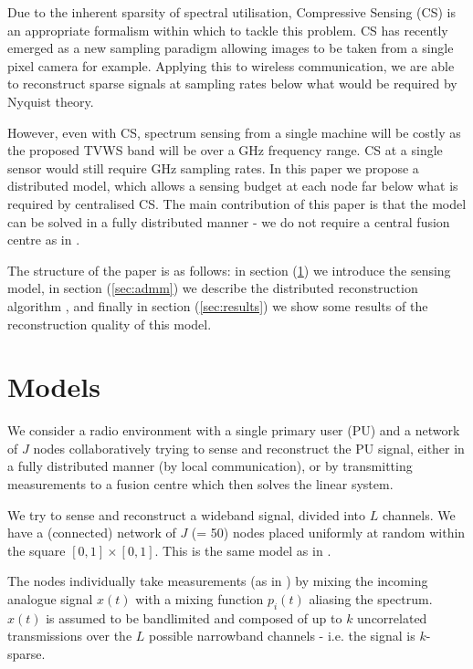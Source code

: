 \documentclass[conference]{IEEEtran}
\begin{document}
Due to the inherent sparsity of spectral utilisation, Compressive Sensing (CS) \cite{Candes2006} is an appropriate formalism within which to tackle this problem. CS has recently emerged as a new sampling paradigm allowing images to be taken from a single pixel camera for example. Applying this to wireless communication, we are able to reconstruct sparse signals at sampling rates below what would be required by Nyquist theory. 

However, even with CS, spectrum sensing from a single machine will be costly as the proposed TVWS band will be over a GHz frequency range. CS at a single sensor would still require GHz sampling rates. In this paper we propose a distributed model, which allows a sensing budget at each node far below what is required by centralised CS. The main contribution of this paper is that the model can be solved in a fully distributed manner - we do not require a central fusion centre as in \cite{Zhang2011b}.

The structure of the paper is as follows: in section (\ref{sec:sensingmodel}) we introduce the sensing model, in section (\ref{sec:admm}) we describe the distributed reconstruction algorithm \cite{mota2013d}, and finally in section (\ref{sec:results}) we show some results of the reconstruction quality of this model. \cite{mishali2010theory} \cite{tropp2010beyond}

\section{Models}\label{sec:sensingmodel}

We consider a radio environment with a single primary user (PU) and a network of \(J\) nodes collaboratively trying to sense and reconstruct the PU signal, either in a fully distributed manner (by local communication), or by transmitting measurements to a fusion centre which then solves the linear system. 

We try to sense and reconstruct a wideband signal, divided into \(L\) channels. We have a (connected) network of \(J\) (= 50) nodes placed uniformly at random within the square \(  \left[0,1\right]\times \left[0,1\right] \). This is the same model as in \cite{Zhang2011b}.

The nodes individually take measurements (as in \cite{mishali2010theory}) by mixing the incoming analogue signal \(x\left(t\right)\) with a mixing function \(p_i\left(t\right)\) aliasing the spectrum. \(x\left(t\right)\) is assumed to be bandlimited and composed of up to \(k\) uncorrelated transmissions over the \(L\) possible narrowband channels - i.e. the signal is \(k\)-sparse. 
\end{document}
